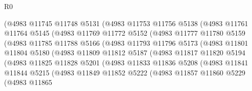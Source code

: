 \begin{lexlean}{R0}
\begin{coremodule}
                    (@4983
                      @11745
                      @11748
                      @5131
                      (@4983
                        @11753
                        @11756
                        @5138
                        (@4983
                          @11761
                          @11764
                          @5145
                          (@4983
                            @11769
                            @11772
                            @5152
                            (@4983
                              @11777
                              @11780
                              @5159
                              (@4983
                                @11785
                                @11788
                                @5166
                                (@4983
                                  @11793
                                  @11796
                                  @5173
                                  (@4983
                                    @11801
                                    @11804
                                    @5180
                                    (@4983
                                      @11809
                                      @11812
                                      @5187
                                      (@4983
                                        @11817
                                        @11820
                                        @5194
                                        (@4983
                                          @11825
                                          @11828
                                          @5201
                                          (@4983
                                            @11833
                                            @11836
                                            @5208
                                            (@4983
                                              @11841
                                              @11844
                                              @5215
                                              (@4983
                                                @11849
                                                @11852
                                                @5222
                                                (@4983
                                                  @11857
                                                  @11860
                                                  @5229
                                                  (@4983
                                                    @11865

\end{coremodule}
\end{lexlean}
